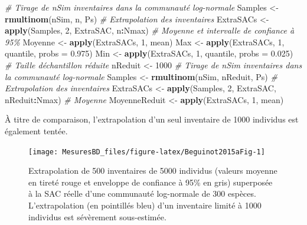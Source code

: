 \documentclass[
  11pt,
  french,
  a4paper,
  extrafontsizes,onecolumn,openright
  ]{memoir}
\newenvironment{Shaded}{\begin{snugshade}}{\end{snugshade}}
\newcommand{\AttributeTok}[1]{\textcolor[rgb]{0.13,0.29,0.53}{#1}}
\newcommand{\CommentTok}[1]{\textcolor[rgb]{0.56,0.35,0.01}{\textit{#1}}}
\newcommand{\DecValTok}[1]{\textcolor[rgb]{0.00,0.00,0.81}{#1}}
\newcommand{\FloatTok}[1]{\textcolor[rgb]{0.00,0.00,0.81}{#1}}
\newcommand{\FunctionTok}[1]{\textcolor[rgb]{0.13,0.29,0.53}{\textbf{#1}}}
\newcommand{\NormalTok}[1]{#1}
\newcommand{\OtherTok}[1]{\textcolor[rgb]{0.56,0.35,0.01}{#1}}
\newcommand{\SpecialCharTok}[1]{\textcolor[rgb]{0.81,0.36,0.00}{\textbf{#1}}}
\begin{document}
\begin{Shaded}
\begin{Highlighting}[]
\CommentTok{\# Tirage de nSim inventaires dans la communauté log{-}normale}
\NormalTok{Samples }\OtherTok{\textless{}{-}} \FunctionTok{rmultinom}\NormalTok{(nSim, n, Ps)}
\CommentTok{\# Extrapolation des inventaires}
\NormalTok{ExtraSACs }\OtherTok{\textless{}{-}} \FunctionTok{apply}\NormalTok{(Samples, }\DecValTok{2}\NormalTok{, ExtraSAC, n}\SpecialCharTok{:}\NormalTok{Nmax)}
\CommentTok{\# Moyenne et intervalle de confiance à 95\%}
\NormalTok{Moyenne }\OtherTok{\textless{}{-}} \FunctionTok{apply}\NormalTok{(ExtraSACs, }\DecValTok{1}\NormalTok{, mean)}
\NormalTok{Max }\OtherTok{\textless{}{-}} \FunctionTok{apply}\NormalTok{(ExtraSACs, }\DecValTok{1}\NormalTok{, quantile, }\AttributeTok{probs =} \FloatTok{0.975}\NormalTok{)}
\NormalTok{Min }\OtherTok{\textless{}{-}} \FunctionTok{apply}\NormalTok{(ExtraSACs, }\DecValTok{1}\NormalTok{, quantile, }\AttributeTok{probs =} \FloatTok{0.025}\NormalTok{)}
\CommentTok{\# Taille d\textquotesingle{}échantillon réduite}
\NormalTok{nReduit }\OtherTok{\textless{}{-}} \DecValTok{1000}
\CommentTok{\# Tirage de nSim inventaires dans la communauté log{-}normale}
\NormalTok{Samples }\OtherTok{\textless{}{-}} \FunctionTok{rmultinom}\NormalTok{(nSim, nReduit, Ps)}
\CommentTok{\# Extrapolation des inventaires}
\NormalTok{ExtraSACs }\OtherTok{\textless{}{-}} \FunctionTok{apply}\NormalTok{(Samples, }\DecValTok{2}\NormalTok{, ExtraSAC, nReduit}\SpecialCharTok{:}\NormalTok{Nmax)}
\CommentTok{\# Moyenne}
\NormalTok{MoyenneReduit }\OtherTok{\textless{}{-}} \FunctionTok{apply}\NormalTok{(ExtraSACs, }\DecValTok{1}\NormalTok{, mean)}
\end{Highlighting}
\end{Shaded}

\normalsize

À titre de comparaison, l'extrapolation d'un seul inventaire de 1000 individus est également tentée.



\scriptsize

\begin{figure}

{\centering \texttt{[image: MesuresBD\_files/figure-latex/Beguinot2015aFig-1]} 

}

\caption{Extrapolation de 500 inventaires de 5000 individus (valeurs moyenne en tireté rouge et enveloppe de confiance à 95\% en gris) superposée à la SAC réelle d'une communauté log-normale de 300 espèces. L'extrapolation (en pointillés bleu) d'un inventaire limité à 1000 individus est sévèrement sous-estimée.}\label{fig:Beguinot2015aFig}
\end{figure}
\end{document}
